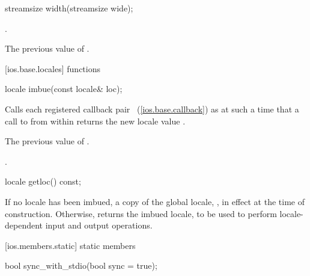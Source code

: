 %
%
\begin{itemdecl}
streamsize width(streamsize wide);
\end{itemdecl}

\begin{itemdescr}
\pnum
\postcondition
{}.

\pnum
\returns
The previous value of
.
\end{itemdescr}

[ios.base.locales]{ functions}

%
\begin{itemdecl}
locale imbue(const locale& loc);
\end{itemdecl}

\begin{itemdescr}
\pnum
\effects
Calls each registered callback pair
~(\ref{ios.base.callback})
as
at such a time that a call to
from within
returns the new locale value
.

\pnum
\returns
The previous value of
.

\pnum
\postcondition
{}.
\end{itemdescr}

%
\begin{itemdecl}
locale getloc() const;
\end{itemdecl}

\begin{itemdescr}
\pnum
\returns
If no locale has been imbued, a copy of the global \Cpp locale,
,
in effect at the time of construction.
Otherwise, returns the imbued locale, to be used to
perform locale-dependent input and output operations.
\end{itemdescr}

[ios.members.static]{ static members}

%
\begin{itemdecl}
bool sync_with_stdio(bool sync = true);
\end{itemdecl}

